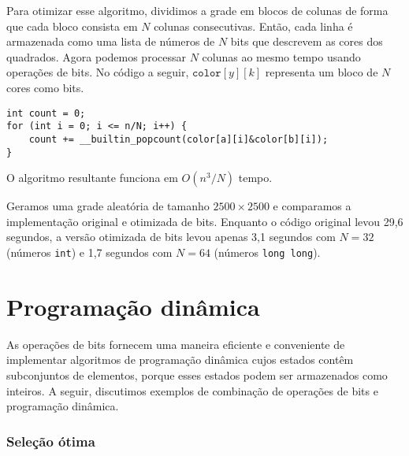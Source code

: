 Para otimizar esse algoritmo, dividimos a grade em blocos
de colunas de forma que cada bloco consista em $N$
colunas consecutivas. Então, cada linha é armazenada como
uma lista de números de $N$ bits que descrevem as cores
dos quadrados. Agora podemos processar $N$ colunas ao mesmo tempo
usando operações de bits. No código a seguir,
$\texttt{color}[y][k]$ representa
um bloco de $N$ cores como bits.
\begin{lstlisting}
int count = 0;
for (int i = 0; i <= n/N; i++) {
    count += __builtin_popcount(color[a][i]&color[b][i]);
}
\end{lstlisting}
O algoritmo resultante funciona em $O(n^3/N)$ tempo.

Geramos uma grade aleatória de tamanho $2500 \times 2500$
e comparamos a implementação original e otimizada de bits.
Enquanto o código original levou 29,6 segundos,
a versão otimizada de bits levou apenas 3,1 segundos
com $N=32$ (números \texttt{int}) e 1,7 segundos
com $N=64$ (números \texttt{long long}).

\section{Programação dinâmica}

As operações de bits fornecem uma maneira eficiente e conveniente
de implementar algoritmos de programação dinâmica
cujos estados contêm subconjuntos de elementos,
porque esses estados podem ser armazenados como inteiros.
A seguir, discutimos exemplos de combinação
de operações de bits e programação dinâmica.

\subsubsection{Seleção ótima}

